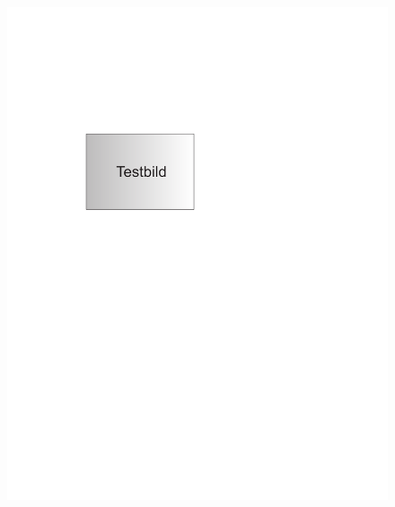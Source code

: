 \begin{figure}[t]
         {\includegraphics[scale=0.8]{images/testimage}\label{fig_testimage2_b}
    }\\
\end{figure}
